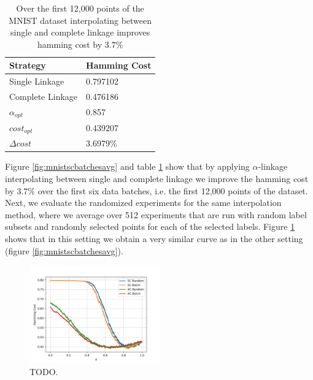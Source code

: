 \begin{table}[H]
    \centering
    \begin{tabular}{|l | l |}
    \hline
    Strategy & Hamming Cost\\ \hline
    Single Linkage & 0.797102\\
    Complete Linkage & 0.476186\\
    $\alpha_{opt}$ & 0.857\\
    $cost_{opt}$ & 0.439207\\
    $\Delta cost$ & 3.6979\%\\\hline
    \end{tabular}
    \caption{Over the first 12,000 points of the MNIST dataset interpolating between single and complete linkage improves hamming cost by $3.7\%$ }
    \label{table:mnist1000avgsc}
\end{table}

Figure \ref{fig:mnistscbatchesavg} and table \ref{table:mnist1000avgsc} show that by applying $\alpha$-linkage interpolating between single and complete linkage we improve the hamming cost by $3.7\%$ over the first six data batches, i.e. the first 12,000 points of the dataset. Next, we evaluate the randomized experiments for the same interpolation method, where we average over 512 experiments that are run with random label subsets and randomly selected points for each of the selected labels. Figure \ref{fig:mnistscrandom} shows that in this setting we obtain a very similar curve as in the other setting (figure \ref{fig:mnistscbatchesavg}).

\begin{figure}[h]
    \centering
    \includegraphics[width=0.5\textwidth]{plots/mnist_1000.png}
    \caption{TODO.}
    \label{fig:mnistscrandom}
\end{figure}

